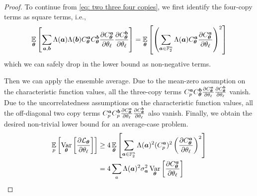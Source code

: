 \documentclass[10pt, twocolumn, a4paper]{article}
\theoremstyle{plain}
\theoremstyle{definition}
\theoremstyle{remark}
\begin{document}
\begin{proof}
To continue from \cref{eq: two three four copies}, we first identify the four-copy terms as square terms, i.e., 
\begin{equation}
    \operatorname*{\mathbb{E}}_{{\bm{\theta}}} \left[ \sum_{{\bm{a}}, {\bm{b}}} \Lambda({\bm{a}}) \Lambda({\bm{b}}) C_{\bm{\theta}}^{\bm{a}} C_{\bm{\theta}}^{\bm{b}} \frac{\partial C_{\bm{\theta}}^{\bm{a}}}{\partial \theta_\ell} \frac{\partial C_{\bm{\theta}}^{\bm{b}}}{\partial \theta_\ell}\right] =\operatorname*{\mathbb{E}}_{{\bm{\theta}}}\left[ \left(\sum_{{\bm{a}} \in \mathbb{F}_2^n} \Lambda({\bm{a}}) C_{\bm{\theta}}^{\bm{a}} \frac{\partial C_{\bm{\theta}}^{\bm{a}}}{\partial \theta_\ell}\right)^2\right]
\end{equation}
which we can safely drop in the lower bound as non-negative terms. 

Then we can apply the ensemble average. Due to the mean-zero assumption on the characteristic function values, all the three-copy terms $C^{\bm{a}}_p C_{\bm{\theta}}^{\bm{b}} \frac{\partial C_{\bm{\theta}}^{\bm{a}}}{\partial \theta_\ell} \frac{\partial C_{\bm{\theta}}^{\bm{b}}}{\partial \theta_\ell}$ vanish. Due to the uncorrelatedness assumptions on the characteristic function values, all the off-diagonal two copy terms $C^{\bm{a}}_p C^{\bm{b}}_p \frac{\partial C_{\bm{\theta}}^{\bm{a}}}{\partial \theta_\ell} \frac{\partial C_{\bm{\theta}}^{\bm{b}}}{\partial \theta_\ell}$ also vanish. Finally, we obtain the desired non-trivial lower bound for an average-case problem.
\begin{align}
 \operatorname*{\mathbb{E}}_p\left[\operatorname*{Var}_{{\bm{\theta}}} \left[ \frac{\partial \mathcal{L}_{\bm{\theta}}}{\partial \theta_\ell} \right]\right] &\geq 4 \operatorname*{\mathbb{E}}_{{\bm{\theta}}}  \left[ \sum_{{\bm{a}} \in \mathbb{F}_2^n} \Lambda({\bm{a}})^2 (C^{\bm{a}}_p)^2 \left(\frac{\partial C_{\bm{\theta}}^{\bm{a}}}{\partial \theta_\ell}\right)^2 \right] \\
 &= 4 \sum_a\Lambda({\bm{a}})^2\sigma_{\bm{a}}^2\operatorname*{Var}_{{\bm{\theta}}} \left[ \frac{\partial C^{\bm{a}}_{\bm{\theta}}}{\partial \theta_\ell} \right] 
\end{align}
\end{proof}
\end{document}
